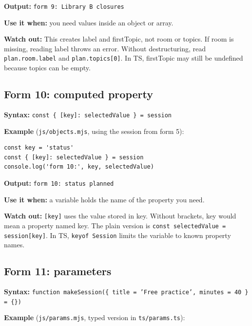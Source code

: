 \documentclass[
  10pt,
  a4paper,
]{article}
\begin{document}
\textbf{Output:} \texttt{form 9:\allowbreak{} Library B closures}

\textbf{Use it when:} you need values inside an object or array.

\textbf{Watch out:} This creates label and firstTopic, not room or
topics. If room is missing, reading label throws an error. Without
destructuring, read \texttt{plan.\allowbreak{}room.\allowbreak{}label}
and \texttt{plan.\allowbreak{}topics[0]}. In TS, firstTopic may still be
undefined because topics can be empty.

\subsection{Form 10: computed property}\label{form-10-computed-property}

\textbf{Syntax:}
\texttt{const \{ [key]:\allowbreak{} selectedValue \} = session}

\textbf{Example} (\texttt{js/\allowbreak{}objects.\allowbreak{}mjs},
using the session from form 5):

\begin{minipage}{\linewidth}

\begin{lstlisting}
const key = 'status'
const { [key]: selectedValue } = session
console.log('form 10:', key, selectedValue)
\end{lstlisting}

\end{minipage}\par

\textbf{Output:} \texttt{form 10:\allowbreak{} status planned}

\textbf{Use it when:} a variable holds the name of the property you
need.

\textbf{Watch out:} \texttt{[key]} uses the value stored in key. Without
brackets, key would mean a property named key. The plain version is
\texttt{const selectedValue = session[key]}. In TS,
\texttt{keyof Session} limits the variable to known property names.

\subsection{Form 11: parameters}\label{form-11-parameters}

\textbf{Syntax:}
\texttt{function makeSession(\{ title = 'Free practice', minutes = 40 \} = \{\})}

\textbf{Example} (\texttt{js/\allowbreak{}params.\allowbreak{}mjs},
typed version in \texttt{ts/\allowbreak{}params.\allowbreak{}ts}):
\end{document}
